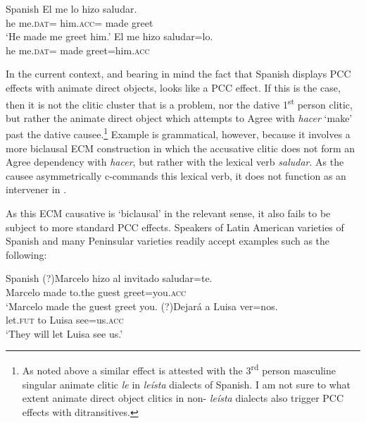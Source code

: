 \documentclass[output=paper,colorlinks,citecolor=brown,nonflat]{./langscibook}
\begin{document}
\ea%
    \label{ex:sheehan:33}
    Spanish \citep[463]{Torrego2010}
    \ea\label{ex:sheehan:33a}
    \gll    *El   me     lo     hizo   saludar.\\
            he   me.\textsc{dat}=  him.\textsc{acc}=  made greet\\
    \glt    ‘He made me greet him.’ 
    \ex\label{ex:sheehan:33b}
    \gll    El   me     hizo   saludar=lo.\\
            he   me.\textsc{dat=}  made   greet=him.\textsc{acc}\\
    \z
\z

In the current context, and bearing in mind the fact that Spanish displays PCC effects with animate direct objects,  looks like a PCC effect. If this is the case, then it is not the clitic cluster that is a problem, nor the dative 1\textsuperscript{st} person clitic, but rather the animate direct object which attempts to Agree with \textit{hacer} ‘make’ past the dative causee.\footnote{As noted above a similar effect is attested with the 3\textsuperscript{rd} person masculine singular animate clitic \textit{le} in \textit{leísta} dialects of Spanish. I am not sure to what extent animate direct object clitics in non- \textit{leísta} dialects also trigger PCC effects with ditransitives.  } Example  is grammatical, however, because it involves a more biclausal ECM construction in which the accusative clitic does not form an Agree dependency with \textit{hacer}, but rather with the lexical verb \textit{saludar}. As the causee asymmetrically c-commands this lexical verb, it does not function as an intervener in . 

As this ECM causative is ‘biclausal’ in the relevant sense, it also fails to be subject to more standard PCC effects. Speakers of Latin American varieties of Spanish and many Peninsular varieties readily accept examples such as the following:

\ea%
    \label{ex:sheehan:34}
    Spanish
    \ea\label{ex:sheehan:34a}
    \gll    (?)Marcelo   hizo   al   invitado  saludar=te.\\
            Marcelo   made  to.the guest greet=you.\textsc{acc}\\
    \glt    `Marcelo made the guest greet you. 
    \ex\label{ex:sheehan:34b}
    \gll    (?)Dejará   a   Luisa   ver=nos.\\
            let.\textsc{fut}   to   Luisa   see=us.\textsc{acc}\\
    \glt    ‘They will let Luisa see us.’ 
    \z
\z
{}
\end{document}
